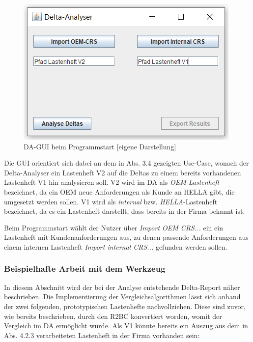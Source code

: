 \documentclass[12pt]{report}
\begin{document}
\begin{figure}[h!]
\begin{center}
\includegraphics[scale=1]{Bilder/DA-GUI-leer.png}
\caption{DA-GUI beim Programmstart [eigene Darstellung]}
\end{center}
\end{figure}

Die GUI orientiert sich dabei an dem in Abs. 3.4 gezeigten Use-Case, wonach der Delta-Analyser ein Lastenheft V2 auf die Deltas zu einem bereits vorhandenen Lastenheft V1 hin analysieren soll. V2 wird im DA als \textit{OEM-Lastenheft} bezeichnet, da ein OEM neue Anforderungen als Kunde an HELLA gibt, die umgesetzt werden sollen. V1 wird als \textit{internal} bzw. \textit{HELLA}-Lastenheft bezeichnet, da es ein Lastenheft darstellt, dass bereits in der Firma bekannt ist.

Beim Programmstart wählt der Nutzer über \textit{Import OEM CRS...} ein ein Lastenheft mit Kundenanforderungen aus, zu denen passende Anforderungen aus einem internen Lastenheft \textit{Import internal CRS... }gefunden werden sollen. 

\subsubsection{Beispielhafte Arbeit mit dem Werkzeug}
In diesem Abschnitt wird der bei der Analyse entstehende Delta-Report näher beschrieben. Die Implementierung der Vergleichsalgorithmen lässt sich anhand der zwei folgenden, prototypischen Lastenhefte nachvollziehen. Diese sind zuvor, wie bereits beschrieben, durch den R2BC konvertiert worden, womit der Vergleich im DA ermöglicht wurde. Als V1 könnte bereits ein Auszug aus dem in Abs. 4.2.3 verarbeiteten Lastenheft in der Firma vorhanden sein:\\
\end{document}
